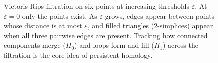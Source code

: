 \begin{figure}[H]
\caption{%
    Vietoris-Rips filtration on six points at increasing thresholds
    $\varepsilon$. At $\varepsilon = 0$ only the points exist. As
    $\varepsilon$ grows, edges appear between points whose distance is at
    most $\varepsilon$, and filled triangles (2-simplices) appear when all
    three pairwise edges are present. Tracking how connected components
    merge ($H_0$) and loops form and fill ($H_1$) across the filtration is
    the core idea of persistent homology.%
}
\label{fig:filtration}
\end{figure}
